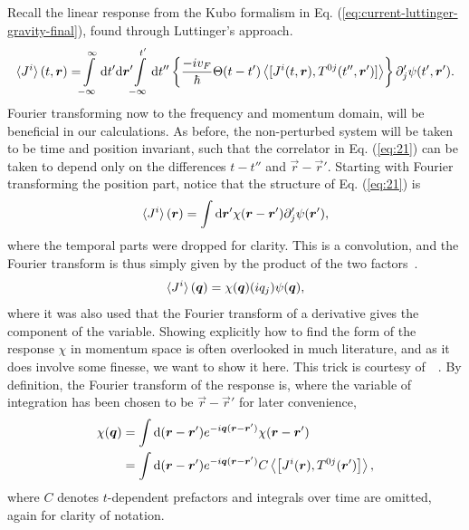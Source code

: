 Recall the linear response from the Kubo formalism in Eq. (\ref{eq:current-luttinger-gravity-final}), found through Luttinger's approach.
\begin{equation}
  \label{eq:21}
  \braket{J^i}(t, \vec{r}) = \!\!
  \int\limits_{-\infty }^{\infty } \mathrm{d}t' \mathrm{d}\vec{r}' \!\!
  \int\limits_{-\infty }^{t'} \mathrm{d}t''
  \left\{
    \frac{-i v_F}{\hbar } \Theta (t-t')
    \Braket{
      [J^i(t, \vec{r}), T^{0j} (t'', \vec{r}')]
    }
  \right\}
  \partial _j' \psi (t', \vec{r}').
\end{equation}
Fourier transforming now to the frequency and momentum domain, will be beneficial in our calculations.
As before, the non-perturbed system will be taken to be time and position invariant, such that the correlator in Eq. (\ref{eq:21}) can be taken to depend only on the differences $t-t''$ and $\vec{r} - \vec{r}' $.
Starting with Fourier transforming the position part, notice that the structure of Eq. (\ref{eq:21}) is
\[
  \braket{J^i}(\vec{r}) = \int \mathrm{d} \vec{r}' \chi (\vec{r} - \vec{r}') \partial _j' \psi  (\vec{r}'),
\]
where the temporal parts were dropped for clarity.
This is a convolution, and the Fourier transform is thus simply given by the product of the two factors~\cite{rottmannMatematiskFormelsamling1995}.
\begin{equation}
  \braket{J^i}(\vec{q}) =
  \chi (\vec{q}) (iq_j) \psi (\vec{q}),
\end{equation}
where it was also used that the Fourier transform of a derivative gives the component of the variable.
Showing explicitly how to find the form of the response $\chi $ in momentum space is often overlooked in much literature, and as it does involve some finesse, we want to show it here.
This trick is courtesy of~\citeauthor{changLectureNotesManybody2018}~\cite{changLectureNotesManybody2018}.
By definition, the Fourier transform of the response is, where the variable of integration has been chosen to be $\vec{r}-\vec{r}'$ for later convenience,
\begin{align}
  \chi (\vec{q}) &= \int \mathrm{d}(\vec{r} - \vec{r}') e^{-i\vec{q}(\vec{r}-\vec{r}')} \chi (\vec{r} - \vec{r}')\\
                 &= \int \mathrm{d}(\vec{r} - \vec{r}') e^{-i\vec{q}(\vec{r}-\vec{r}')} C \Braket{
                   \left[
J^i (\vec{r}), T^{0j}(\vec{r}')
                   \right]},\\
\end{align}
where $C$ denotes $t$-dependent prefactors and integrals over time are omitted, again for clarity of notation.
